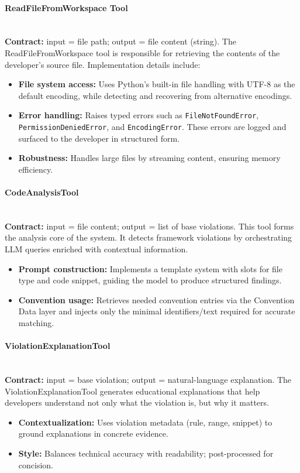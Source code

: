 \begin{spacing}{1.2}
\paragraph{ReadFileFromWorkspace Tool}\\
\textbf{Contract:} input = file path; output = file content (string).  
The ReadFileFromWorkspace tool is responsible for retrieving the contents of the developer’s source file. Implementation details include:
\begin{itemize}
    \item \textbf{File system access:} Uses Python’s built-in file handling with UTF-8 as the default encoding, while detecting and recovering from alternative encodings.
    \item \textbf{Error handling:} Raises typed errors such as \texttt{FileNotFoundError}, \texttt{PermissionDeniedError}, and \texttt{EncodingError}. These errors are logged and surfaced to the developer in structured form.
    \item \textbf{Robustness:} Handles large files by streaming content, ensuring memory efficiency.
\end{itemize}

\paragraph{CodeAnalysisTool}\\
\textbf{Contract:} input = file content; output = list of base violations.  
This tool forms the analysis core of the system. It detects framework violations by orchestrating LLM queries enriched with contextual information.
\begin{itemize}
    \item \textbf{Prompt construction:} Implements a template system with slots for file type and code snippet, guiding the model to produce structured findings.
    \item \textbf{Convention usage:} Retrieves needed convention entries via the Convention Data layer and injects only the minimal identifiers/text required for accurate matching.
\end{itemize}

\paragraph{ViolationExplanationTool}\\
\textbf{Contract:} input = base violation; output = natural-language explanation.  
The ViolationExplanationTool generates educational explanations that help developers understand not only what the violation is, but why it matters.
\begin{itemize}
    \item \textbf{Contextualization:} Uses violation metadata (rule, range, snippet) to ground explanations in concrete evidence.
    \item \textbf{Style:} Balances technical accuracy with readability; post-processed for concision.
\end{itemize}


\end{spacing}

